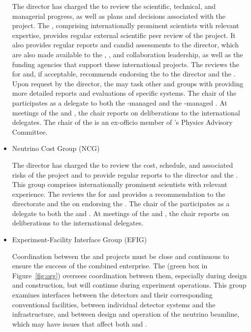 \begin{itemize}
The  director has charged the  to review the scientific, technical, and managerial progress, as well as plans and decisions associated with the  project. %
The  , comprising internationally prominent scientists with relevant expertise, 
provides regular external scientific peer review of the project. It also provides regular reports and candid assessments to the  director, which are also made available to the , , and  collaboration leadership, as well as the funding agencies that support these international projects. The   reviews the  for  and, if acceptable, recommends endorsing the   to the  director and the . Upon request by the  director, the   may task other  and  groups with providing more detailed reports and evaluations of specific systems. The chair of the   participates as a delegate to both the -managed  and the -managed . At meetings of the  and , the  chair reports on   deliberations to the international delegates. The chair of the   is an ex-officio member of  's Physics Advisory Committee.



\item Neutrino Cost Group (NCG)

The  director has charged the  to review the cost, schedule, and associated risks of the  project and to provide regular reports to the  director and the . This group comprises internationally prominent scientists with relevant experience. 
The   reviews the   for  and provides a recommendation to the  directorate and the  on endorsing the  . The chair of the   participates as a delegate to both the %
 and %
. At meetings of the  and , the  chair %
reports on   deliberations to the international delegates.


\item Experiment-Facility Interface Group (EFIG)

Coordination between the  and  projects must be close and continuous to ensure the success of the combined enterprise. The  (green box in Figure~\ref{fig:org}) oversees coordination between them, especially during design and construction, but will continue during experiment operations. %
This group examines interfaces between the detectors and their corresponding conventional facilities, between individual detector systems and the  infrastructure, and between design and operation of the  neutrino beamline,  which may have issues that affect both  and .  

\end{itemize}

